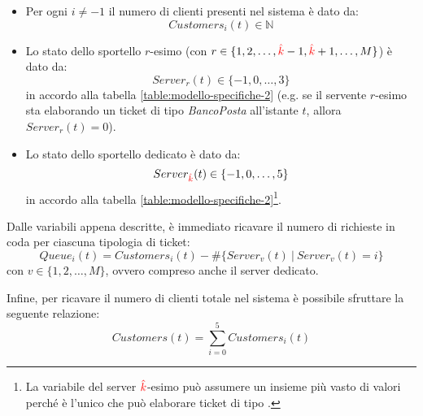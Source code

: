 \begin{itemize}
\item Per ogni $i \neq -1$ il numero di clienti presenti nel sistema è dato da:
\begin{equation}
\label{eqn:modello-specifiche-2}
Customers_i(t) \in \mathbb{N}
\end{equation}
\item Lo stato dello sportello $r$-esimo (con $r \in \lbrace 1, 2, \dots, {\color{red}\hat{k}}-1, {\color{red}\hat{k}}+1, \dots, M \rbrace$) è dato da:
\begin{equation}
\label{eqn:modello-specifiche-3}
Server_r(t) \in \lbrace -1, 0, \dots, 3 \rbrace
\end{equation}
in accordo alla tabella \ref{table:modello-specifiche-2} (e.g. se il servente $r$-esimo sta elaborando un ticket di tipo \uo{} \textsl{BancoPosta} all'istante $t$, allora $Server_r(t)=0$).
\item Lo stato dello sportello dedicato è dato da:
\begin{equation}
\label{eqn:modello-specifiche-4}
Server_{\color{red}\hat{k}}(t) \in \lbrace -1, 0, \dots, 5 \rbrace
\end{equation}
in accordo alla tabella \ref{table:modello-specifiche-2}\footnote{La variabile del server ${\color{red}\hat{k}}$-esimo può assumere un insieme più vasto di valori perché è l'unico che può elaborare ticket di tipo \sr{}.}.
\end{itemize}

Dalle variabili appena descritte, è immediato ricavare il numero di richieste in coda per ciascuna tipologia di ticket:
\begin{equation}
Queue_i(t) = Customers_i(t) - \# \lbrace Server_v(t)\ \vert\ Server_v(t) = i \rbrace
\end{equation}
con $v \in \lbrace 1, 2, \dots, M \rbrace$, ovvero compreso anche il server dedicato.

Infine, per ricavare il numero di clienti totale nel sistema è possibile sfruttare la seguente relazione:
\begin{equation}
Customers(t) = \sum_{i=0}^{5} Customers_i(t)
\end{equation}

